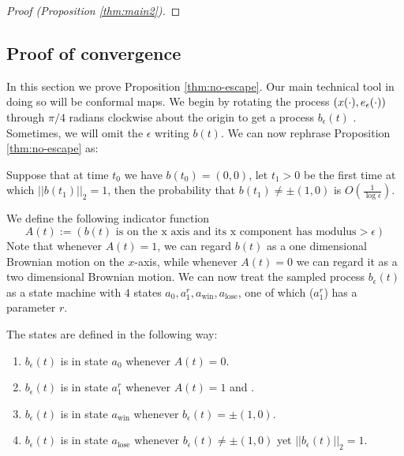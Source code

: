 {\begin{proof}[Proof (Proposition \ref{thm:main2})]
\end{proof}

\subsection{Proof of convergence}\label{sec:POC}
{
In this section we prove Proposition \ref{thm:no-escape}. Our main technical tool in doing so will
be conformal maps. We begin by rotating the process $(x(\cdot), e_\epsilon(\cdot))$
through $\pi/4$ radians clockwise about the origin to get a process
$b_\epsilon(t)$ .
Sometimes, we will omit the $\epsilon$ writing $b(t)$. 
We can now rephrase Proposition
\ref{thm:no-escape} as:

\begin{propos}\label{prop:reph}
Suppose that at time $t_0$ we have
${b}(t_0)=(0,0)$, let $t_1>0$ be the first time at which
$||b(t_1)||_2=1$, then the probability that $b(t_1)\neq \pm(1,0)$ is
$O\left(\frac1{\log\epsilon}\right)$.
\end{propos}

We define the following indicator function
\newcommand{\online}[1]{A(#1)}
\[\online{t} := (b(t) \text{ is on the x axis and its x component has modulus
} > \epsilon)\]
Note that whenever $\online{t}=1$,
we can regard $b(t)$ as a one dimensional Brownian motion on the
$x$-axis, while whenever $\online{t}=0$ we can regard it as a two
dimensional Brownian motion. We can now treat the sampled
process $b_\epsilon(t)$ as a state machine with $4$ states
$a_0,a^r_1,a_{\text{win}},a_{\text{lose}}$, one of which ($a^r_1$) has a parameter $r$.

The states are defined in the following way:
\begin{enumerate}
\item\label{n1} $b_\epsilon(t)$ is in state $a_0$ whenever $\online{t}=0$.
\item\label{n2} $b_\epsilon(t)$ is in state $a^r_1$ whenever
  $\online{t}=1$ and \FIXME{$|x(\sup_{s<t}(\online{s}=0))|=r$}{this is
  not right}.
\item\label{n3} $b_\epsilon(t)$ is in state $a_\text{win}$ whenever $b_\epsilon(t)=\pm(1,0)$.
\item\label{n4} $b_\epsilon(t)$ is in state $a_\text{lose}$ whenever $b_\epsilon(t)\neq\pm(1,0)$ yet $||b_\epsilon(t)||_2=1$.
\end{enumerate}

}}
